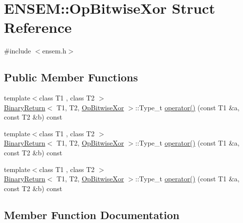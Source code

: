 \hypertarget{structENSEM_1_1OpBitwiseXor}{}\section{E\+N\+S\+EM\+:\+:Op\+Bitwise\+Xor Struct Reference}
\label{structENSEM_1_1OpBitwiseXor}


{\ttfamily \#include $<$ensem.\+h$>$}

\subsection*{Public Member Functions}
\begin{DoxyCompactItemize}
\item 
{\footnotesize template$<$class T1 , class T2 $>$ }\\\mbox{\hyperlink{structENSEM_1_1BinaryReturn}{Binary\+Return}}$<$ T1, T2, \mbox{\hyperlink{structENSEM_1_1OpBitwiseXor}{Op\+Bitwise\+Xor}} $>$\+::Type\+\_\+t \mbox{\hyperlink{structENSEM_1_1OpBitwiseXor_a591fa418b54f1df31f5b4120860f1e42}{operator()}} (const T1 \&a, const T2 \&b) const
\item 
{\footnotesize template$<$class T1 , class T2 $>$ }\\\mbox{\hyperlink{structENSEM_1_1BinaryReturn}{Binary\+Return}}$<$ T1, T2, \mbox{\hyperlink{structENSEM_1_1OpBitwiseXor}{Op\+Bitwise\+Xor}} $>$\+::Type\+\_\+t \mbox{\hyperlink{structENSEM_1_1OpBitwiseXor_a591fa418b54f1df31f5b4120860f1e42}{operator()}} (const T1 \&a, const T2 \&b) const
\item 
{\footnotesize template$<$class T1 , class T2 $>$ }\\\mbox{\hyperlink{structENSEM_1_1BinaryReturn}{Binary\+Return}}$<$ T1, T2, \mbox{\hyperlink{structENSEM_1_1OpBitwiseXor}{Op\+Bitwise\+Xor}} $>$\+::Type\+\_\+t \mbox{\hyperlink{structENSEM_1_1OpBitwiseXor_a591fa418b54f1df31f5b4120860f1e42}{operator()}} (const T1 \&a, const T2 \&b) const
\end{DoxyCompactItemize}


\subsection{Member Function Documentation}
\mbox{\label{structENSEM_1_1OpBitwiseXor_a591fa418b54f1df31f5b4120860f1e42}} 
